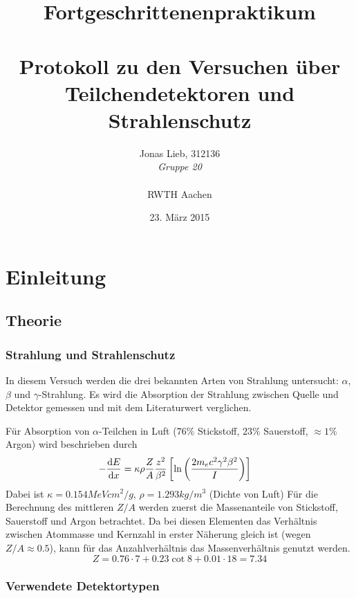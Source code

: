 \documentclass{../Misc/MontavonLaTeX/Montavon}
\date{23. März 2015}
\begin{document}
\title{Fortgeschrittenenpraktikum \\ \quad \\ Protokoll zu den Versuchen über Teilchendetektoren und Strahlenschutz}
\author{Jonas Lieb, 312136 \\ \emph{Gruppe 20} \\ \\  RWTH Aachen}
\maketitle

\newpage

\setcounter{tocdepth}{2}
\tableofcontents
\newpage

\section{Einleitung}
\subsection{Theorie}
\subsubsection{Strahlung und Strahlenschutz}
In diesem Versuch werden die drei bekannten Arten von Strahlung untersucht: $\alpha$, $\beta$ und $\gamma$-Strahlung. Es wird die Absorption der Strahlung zwischen Quelle und Detektor gemessen und mit dem Literaturwert verglichen.

Für Absorption von $\alpha$-Teilchen in Luft ($76 \unit{\%}$ Stickstoff, $23 \unit{\%}$ Sauerstoff, $\approx 1 \unit{\%}$ Argon) wird beschrieben durch
\begin{align*}
- \frac{\mathrm d E}{\mathrm d x} &= \kappa \rho \frac{Z}{A} \frac{z^2}{\beta^2} \left[\ln\left(\frac{2 m_e c^2 \gamma^2 \beta^2}{I}\right) \right] 
\end{align*}
Dabei ist $\kappa = 0.154 \unit{MeV cm^2 / g}$, $\rho = 1.293 \unit{kg/m^3}$ (Dichte von Luft)
Für die Berechnung des mittleren $Z/A$ werden zuerst die Massenanteile von Stickstoff, Sauerstoff und Argon betrachtet. 
Da bei diesen Elementen das Verhältnis zwischen Atommasse und Kernzahl in erster Näherung gleich ist (wegen $Z/A \approx 0.5$), kann für das Anzahlverhältnis das Massenverhältnis genutzt werden. 
\[
Z = 0.76 \cdot 7 + 0.23 \cot 8 + 0.01 \cdot 18 = 7.34
\]


\subsubsection{Verwendete Detektortypen}
\end{document}
